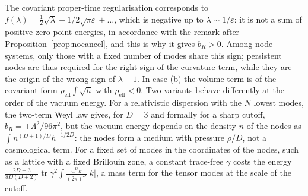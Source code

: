 \documentclass[11pt,a4paper]{article}
\theoremstyle{stmt}
\theoremstyle{defn}
\theoremstyle{rmk}
\numberwithin{equation}{section}
\newcommand{\dd}{\mathrm{d}}
\begin{document}
The covariant proper-time regularisation corresponds to $f(\lambda)=\tfrac12\sqrt\lambda-1/2\sqrt{\pi\varepsilon}+\dots$, which is negative up to $\lambda\sim1/\varepsilon$: it is not a sum of positive zero-point energies, in accordance with the remark after Proposition~\ref{prop:nocancel}, and this is why it gives $b_R>0$. Among node systems, only those with a fixed number of modes share this sign; persistent nodes are thus required for the right sign of the curvature term, while they are the origin of the wrong sign of $\lambda-1$. In case (b) the volume term is of the covariant form $\rho_{\mathrm{eff}}\int\sqrt h$ with $\rho_{\mathrm{eff}}<0$. Two variants behave differently at the order of the vacuum energy. For a relativistic dispersion with the $N$ lowest modes, the two-term Weyl law gives, for $D=3$ and formally for a sharp cutoff, $b_R=+\Lambda^2/96\pi^2$, but the vacuum energy depends on the density $n$ of the nodes as $\int n^{(D+1)/D}h^{-1/2D}$: the nodes form a medium with pressure $\rho/D$, not a cosmological term. For a fixed set of modes in the coordinates of the nodes, such as a lattice with a fixed Brillouin zone, a constant trace-free $\gamma$ costs the energy $\frac{2D+3}{8D(D+2)}\operatorname{tr}\gamma^2\int\frac{\dd^Dk}{(2\pi)^D}|k|$, a mass term for the tensor modes at the scale of the cutoff.
\end{document}
